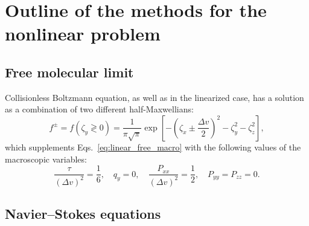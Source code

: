 \documentclass[review]{elsarticle}
\begin{document}
\section{Outline of the methods for the nonlinear problem}

\subsection{Free molecular limit}

Collisionless Boltzmann equation, as well as in the linearized case,
has a solution as a combination of two different half-Maxwellians:
\begin{equation}\label{eq:free_solution}
    f^\pm = f(\zeta_y \gtrless 0) =
        \frac1{\pi\sqrt{\pi}} \exp\left[-\left(\zeta_x\pm\frac{\Delta{v}}2\right)^2 - \zeta_y^2 - \zeta_z^2\right],
\end{equation}
which supplements Eqs.~\eqref{eq:linear_free_macro} with the following values of the macroscopic variables:
\begin{equation}\label{eq:free_macro}
    \frac{\tau}{(\Delta{v})^2} = \frac16, \quad q_y = 0, \quad
    \frac{P_{xx}}{(\Delta{v})^2} = \frac12, \quad P_{yy} = P_{zz} = 0.
\end{equation}

\subsection{Navier--Stokes equations}\label{sec:Navier-Stokes}
\end{document}
